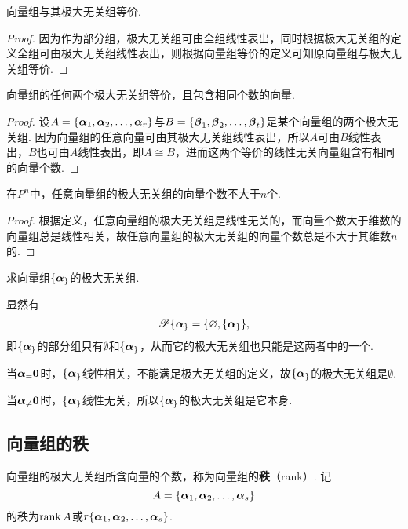 \begin{property}
向量组与其极大无关组等价.
\begin{proof}
因为作为部分组，极大无关组可由全组线性表出，同时根据极大无关组的定义全组可由极大无关组线性表出，则根据向量组等价的定义可知原向量组与极大无关组等价.
\end{proof}
\end{property}

\begin{corollary}
向量组的任何两个极大无关组等价，且包含相同个数的向量.
\begin{proof}
\def\a#1{\mat{\alpha}_{#1}}
\def\b#1{\mat{\beta}_{#1}}
设\(A=\{\a1,\a2,\dots,\a r\}\)与\(B=\{\b1,\b2,\dotsc,\b t\}\)是某个向量组的两个极大无关组.
因为向量组的任意向量可由其极大无关组线性表出，所以\(A\)可由\(B\)线性表出，\(B\)也可由\(A\)线性表出，即\(A \cong B\)，进而这两个等价的线性无关向量组含有相同的向量个数.
\end{proof}
\end{corollary}

\begin{theorem}
在\(P^n\)中，任意向量组的极大无关组的向量个数不大于\(n\)个.
\begin{proof}
根据定义，任意向量组的极大无关组是线性无关的，而向量个数大于维数的向量组总是线性相关，故任意向量组的极大无关组的向量个数总是不大于其维数\(n\)的.
\end{proof}
\end{theorem}

\begin{example}
求向量组\(\{\a\}\)的极大无关组.
\begin{solution}
显然有\[
\Powerset\{\a\} = \{ \emptyset, \{\a\} \},
\]即\(\{\a\}\)的部分组只有\(\emptyset\)和\(\{\a\}\)，从而它的极大无关组也只能是这两者中的一个.

当\(\a=\z\)时，\(\{\a\}\)线性相关，不能满足极大无关组的定义，故\(\{\a\}\)的极大无关组是\(\emptyset\).

当\(\a\neq\z\)时，\(\{\a\}\)线性无关，所以\(\{\a\}\)的极大无关组是它本身.
\end{solution}
\end{example}

\subsection{向量组的秩}
\begin{definition}
向量组的极大无关组所含向量的个数，称为向量组的\textbf{秩}（rank）.
记\[
A = \{\boldsymbol{\alpha}_1,\boldsymbol{\alpha}_2,\dotsc,\boldsymbol{\alpha}_s\}
\]的秩为\(\rank A\)或\(r\{\boldsymbol{\alpha}_1,\boldsymbol{\alpha}_2,\dotsc,\boldsymbol{\alpha}_s\}\).
\end{definition}

